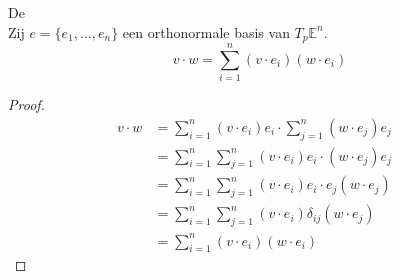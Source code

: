 \documentclass[main.tex]{subfiles}
\begin{document}
\begin{gev}
  \label{gev:identiteit-van-parseval}
  De \\
  Zij $e = \{e_{1},\dotsc,e_{n}\}$ een orthonormale basis van $T_{p}\mathbb{E}^{n}$. 
  \[ v \cdot w = \sum_{i=1}^{n}(v \cdot e_{i})(w \cdot e_{i})\]

  \begin{proof}
    \[
    \begin{array}{rll}

      v \cdot w &= \sum_{i=1}^{n} (v \cdot e_{i})e_{i} \cdot \sum_{j=1}^{n} (w \cdot e_{j})e_{j} &\\ 
                &= \sum_{i=1}^{n}\sum_{j=1}^{n}  (v \cdot e_{i})e_{i} \cdot (w \cdot e_{j})e_{j} &\\
                &= \sum_{i=1}^{n}\sum_{j=1}^{n}  (v \cdot e_{i})e_{i} \cdot e_{j}(w \cdot e_{j}) &\\
                &= \sum_{i=1}^{n}\sum_{j=1}^{n}  (v \cdot e_{i})\delta_{ij}(w \cdot e_{j}) &\\
                &= \sum_{i=1}^{n}(v \cdot e_{i})(w \cdot e_{i})
    \end{array}
    \]
  \end{proof}
\end{gev}

\end{document}
